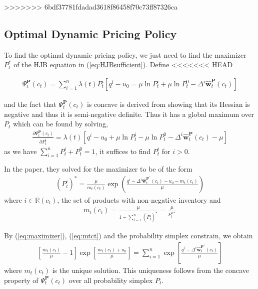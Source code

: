 >>>>>>> 6bdf37781fdadad3618f86458f70c73ff87326ca

\subsection{Optimal Dynamic Pricing Policy}

To find the optimal dynamic pricing policy, we just need to find the maximizer $P_t^\ast$ of the HJB equation in (\ref{eq:HJBsufficient}). Define
<<<<<<< HEAD

\begin{align*}
\Psi_t^{\mathbf{P}}(c_t) = \sum_{i=1}^{n}\lambda(t) P_t^i\left[q^i - u_0 = \mu \ln P_t^i + \mu \ln P_t^0 - \Delta^i\hat{\mathbf{w}}_t^{\mathbf{P}}(c_t)\right]
\end{align*}

and the fact that $\Psi_t^{\mathbf{P}}(c_t)$ is concave is derived from showing that its Hessian is negative and thus it is semi-negative definite. Thus it has a global maximum over $P_t$ which can be found by solving,
\begin{align}
\frac{\partial \Psi_t^{\mathbf{P}}(c_t)}{\partial P_t^i} = \lambda(t) \left[q^i - u_0 + \mu \ln P_t^i - \mu \ln P_t^0 - \Delta^i \hat{\mathbf{w}}_t^{\mathbf{P}}(c_t)-\mu\right]
\end{align}
as we have $\sum_{i=1}^{n}P_t^i + P_t^0 = 1$, it suffices to find $P_t^i$ for $i>0$. 

In the paper, they solved for the maximizer to be of the form
\begin{align}
(P_t^i)^\ast = \frac{\mu}{m_t(c_t)}\exp \left(\frac{q^i-\Delta^i \hat{\mathbf{w}}_t^{\mathbf{P}^\ast}(c_t)-u_0 - m_t(c_t)}{\mu}\right)\label{eq:maximizer}
\end{align}
where $i \in \mathbb{R}(c_t)$, the set of products with non-negative inventory and 
\begin{align}
m_t(c_t) = \frac{\mu}{1 - \sum_{i=1}^{n}(P_t^i)^\ast} = \frac{\mu}{P_t^{0\ast}}\label{eq:mtct}
\end{align}

By (\ref{eq:maximizer}), (\ref{eq:mtct}) and the probability simplex constrain, we obtain
\begin{align}
\left[\frac{m_t(c_t)}{\mu}-1\right] \exp \left[\frac{m_t(c_t)+u_0}{\mu}\right] = \sum_{i=1}^{n}\exp \left[\frac{q^i-\Delta^i \hat{\mathbf{w}}_t^{\mathbf{P}^\ast}(c_t)}{\mu}\right]\label{eq:uniquesol}
\end{align}
where $m_t(c_t)$ is the unique solution. This uniqueness follows from the concave property of $\Psi_t^{\mathbf{P}}(c_t)$ over all probability simplex $P_t$.

